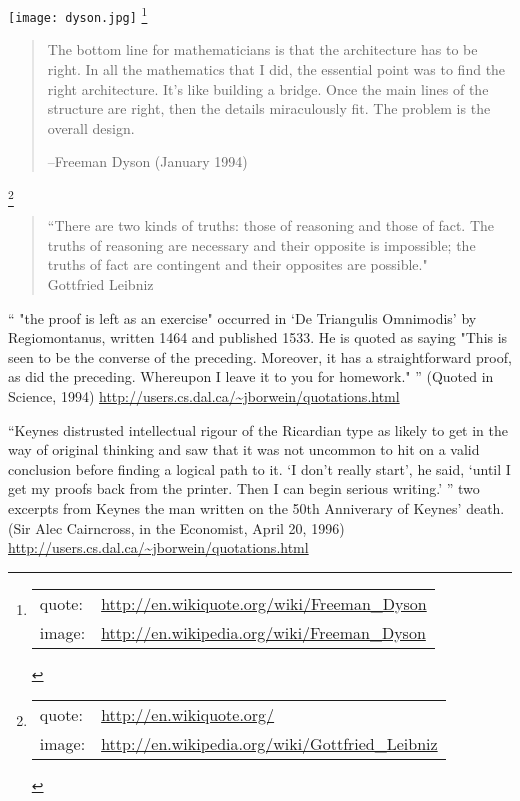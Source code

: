 \texttt{[image: dyson.jpg]}
\footnote{\begin{tabular}[t]{ll}
  quote: & \url{http://en.wikiquote.org/wiki/Freeman_Dyson} \\
  image: & \url{http://en.wikipedia.org/wiki/Freeman_Dyson}
\end{tabular}}
\parbox[b][5cm][c]{12cm}{
\begin{quote}
\quoteo The bottom line for mathematicians is that the architecture has to be right.
In all the mathematics that I did, the essential point was to find
the right architecture.
It's like building a bridge.
Once the main lines of the structure are right,
then the details miraculously fit.
The problem is the overall design.\quotec

--Freeman Dyson (January 1994)
\end{quote}
}


\footnote{\begin{tabular}[t]{ll}
  quote: & \url{http://en.wikiquote.org/} \\
  image: & \url{http://en.wikipedia.org/wiki/Gottfried\_Leibniz}
\end{tabular}}
\parbox[b][][t]{12cm}{
  \begin{quote}
  ``There are two kinds of truths: 
  those of reasoning and those of fact. 
  The truths of reasoning are necessary and their opposite is impossible; 
  the truths of fact are contingent and their opposites are possible." \\
  Gottfried Leibniz
  \end{quote}
}



     `` "the proof is left as an exercise" occurred in  `De Triangulis Omnimodis' by Regiomontanus, written 1464 and published 1533. He is quoted as saying "This is seen to be the converse of the preceding. Moreover, it has a straightforward proof, as did the preceding. Whereupon I leave it to you for homework." '' 
(Quoted in Science, 1994) 
\url{http://users.cs.dal.ca/~jborwein/quotations.html}


     ``Keynes distrusted intellectual rigour of the Ricardian type as likely to get in the way of original thinking and saw that it was not uncommon to hit on a valid conclusion before finding a logical path to it.
    `I don't really start', he said, `until I get my proofs back from the printer. Then I can begin serious writing.' ''
    two excerpts from Keynes the man written on the 50th Anniverary of Keynes' death.
(Sir Alec Cairncross, in the Economist, April 20, 1996) 
\url{http://users.cs.dal.ca/~jborwein/quotations.html}

